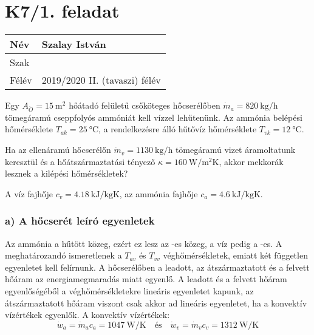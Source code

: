 
\section*{K7/1. feladat}

\begin{tabular}{ | p{2cm} | p{14cm} | } 
	\hline
	Név & Szalay István \\ 
	\hline
	Szak & \\ 
	\hline
	Félév & 2019/2020 II. (tavaszi) félév \\ 
	\hline
\end{tabular}
\vspace{0.5cm}

\noindent Egy $A_{\ddot{O}} = \SI{15}{\meter\squared}$ hőátadó felületű csőköteges hőcserélőben $\dot{m}_a = \SI{820}{\kilogram\per\hour}$ tömegáramú cseppfolyós ammóniát kell vízzel lehűtenünk. Az ammónia belépési hőmérséklete $T_{ak} = \SI{25}{\celsius}$, a rendelkezésre álló hűtővíz hőmérséklete $T_{vk} = \SI{12}{\celsius}$.

Ha az ellenáramú hőcserélőn $\dot{m}_v = \SI{1130}{\kilogram\per\hour}$ tömegáramú vizet áramoltatunk keresztül és a hőátszármaztatási tényező $\kappa = \SI{160}{\watt\per\meter\squared\kelvin}$, akkor mekkorák lesznek a kilépési hőmérsékletek?

A víz fajhője $c_v = \SI{4.18}{\kilo\joule\per\kilogram\kelvin}$, az ammónia fajhője $c_a = \SI{4.6}{\kilo\joule\per\kilogram\kelvin}$.

\subsubsection*{a) A hőcserét leíró egyenletek}
Az ammónia a hűtött közeg, ezért ez lesz az -es közeg, a víz pedig a -es. A meghatározandó ismeretlenek a $T_{av}$ és $T_{vv}$ véghőmérsékletek, emiatt két független egyenletet kell felírnunk. A hőcserélőben a leadott, az átszármaztatott és a felvett hőáram az energiamegmaradás miatt egyenlő. A leadott és a felvett hőáram egyenlőségéből a véghőmérsékletekre lineáris egyenletet kapunk, az átszármaztatott hőáram viszont csak akkor ad lineáris egyenletet, ha a konvektív vízértékek egyenlők. 
A konvektív vízértékek:
\begin{equation}
	\dot{w}_a = \dot{m}_a c_a = \SI{1047}{\watt\per\kelvin} 
	\quad \textrm{és} \quad 
	\dot{w}_v = \dot{m}_v c_v = \SI{1312}{\watt\per\kelvin} 
\end{equation}

